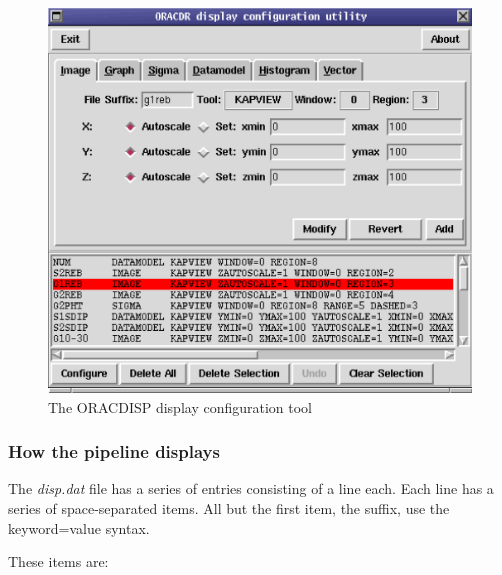 \documentclass[twoside,11pt]{article}
\renewcommand{\_}{\texttt{\symbol{95}}}
\begin{document}
\begin{figure}
\includegraphics[width=\textwidth]{sun230_disp.eps}
\caption{The ORACDISP display configuration tool}
\end{figure}

\subsubsection*{How the pipeline displays\label{The_ORAC-DR_Display_System_How_the_pipeline_displays}}

The \emph{disp.dat} file has a series of entries consisting of a line
each. Each line has a series of space-separated items.  All but
the first item, the suffix, use the keyword=value syntax.



These items are:
\end{document}
